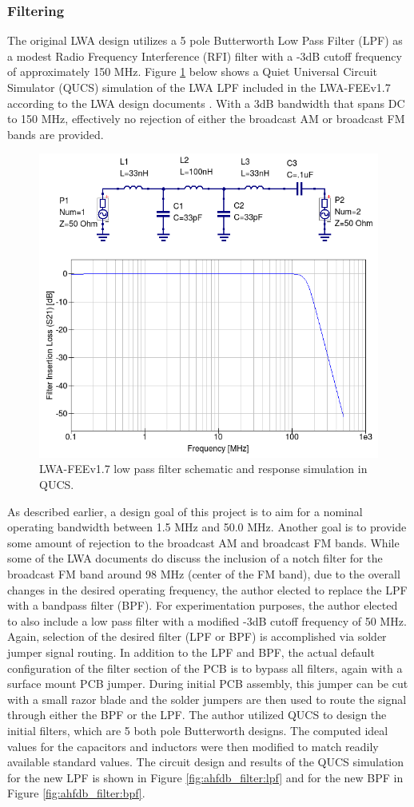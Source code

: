 \subsubsection{Filtering}
\label{subsubsec:technical:deviation:filtering}
The original LWA design utilizes a 5 pole Butterworth Low Pass Filter (LPF) as a modest Radio Frequency Interference (RFI) filter with a -3dB cutoff frequency of approximately 150 MHz.
Figure \ref{fig:lwa_lpf} below shows a Quiet Universal Circuit Simulator (QUCS) simulation of the LWA LPF included in the LWA-FEEv1.7 according to the LWA design documents \cite{lwa_memo_190}.
With a 3dB bandwidth that spans DC to 150 MHz, effectively no rejection of either the broadcast AM or broadcast FM bands are provided.

\begin{figure}[h!]
  \centering
  \includegraphics[width=0.55\linewidth]{figures/lwa_lpf.png}
  \caption{LWA-FEEv1.7 low pass filter schematic and response simulation in QUCS.}
  \label{fig:lwa_lpf}
\end{figure}

As described earlier, a design goal of this project is to aim for a nominal operating bandwidth between 1.5 MHz and 50.0 MHz.
Another goal is to provide some amount of rejection to the broadcast AM and broadcast FM bands.
While some of the LWA documents do discuss the inclusion of a notch filter for the broadcast FM band around 98 MHz (center of the FM band), due to the overall changes in the desired operating frequency, the author elected to replace the LPF with a bandpass filter (BPF).
For experimentation purposes, the author elected to also include a low pass filter with a modified -3dB cutoff frequency of 50 MHz.
Again, selection of the desired filter (LPF or BPF) is accomplished via solder jumper signal routing.
In addition to the LPF and BPF, the actual default configuration of the filter section of the PCB is to bypass all filters, again with a surface mount PCB jumper.
During initial PCB assembly, this jumper can be cut with a small razor blade and the solder jumpers are then used to route the signal through either the BPF or the LPF. 
The author utilized QUCS to design the initial filters, which are 5 both pole Butterworth designs.
The computed ideal values for the capacitors and inductors were then modified to match readily available standard values.
The circuit design and results of the QUCS simulation for the new LPF is shown in Figure \ref{fig:ahfdb_filter:lpf} and for the new BPF in Figure \ref{fig:ahfdb_filter:bpf}.

